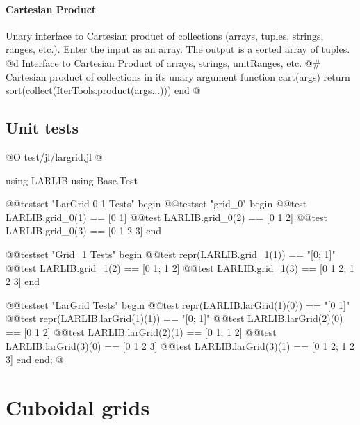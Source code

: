 \paragraph{Cartesian Product}
Unary interface to Cartesian product of collections (arrays, tuples, strings, ranges, etc.).
Enter the input as an array. The output is a sorted array of tuples.
@d Interface to Cartesian Product of arrays, strings, unitRanges, etc.
@{# Cartesian product of collections in its unary argument
function cart(args)
	return sort(collect(IterTools.product(args...)))
end
@}


\subsection{Unit tests}

@O test/jl/largrid.jl
@{
using LARLIB
using Base.Test

@@testset "LarGrid-0-1 Tests" begin
   @@testset "grid_0" begin
      @@test LARLIB.grid_0(1) == [0  1]
      @@test LARLIB.grid_0(2) == [0  1  2]
      @@test LARLIB.grid_0(3) == [0  1  2  3]
   end
   
   @@testset "Grid_1 Tests" begin
      @@test repr(LARLIB.grid_1(1)) == "[0; 1]"
      @@test LARLIB.grid_1(2) == [0 1; 1 2]
      @@test LARLIB.grid_1(3) == [0 1 2; 1 2 3]
   end
   
   @@testset "LarGrid Tests" begin
      @@test repr(LARLIB.larGrid(1)(0)) == "[0 1]"
      @@test repr(LARLIB.larGrid(1)(1)) == "[0; 1]"
      @@test LARLIB.larGrid(2)(0) == [0  1  2]
      @@test LARLIB.larGrid(2)(1) == [0 1; 1 2]
      @@test LARLIB.larGrid(3)(0) == [0  1  2  3]
      @@test LARLIB.larGrid(3)(1) == [0  1  2; 1  2  3]
   end
end;
@}

\section{Cuboidal grids}\label{sec:cuboids}

